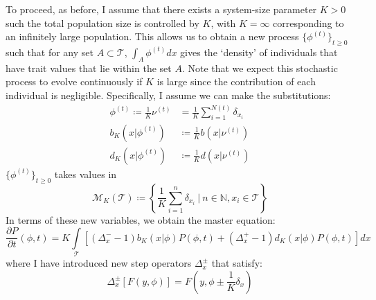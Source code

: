 To proceed, as before, I assume that there exists a system-size parameter $K > 0$ such the total population size is controlled by $K$, with $K = \infty$ corresponding to an infinitely large population. This allows us to obtain a new process $\{\phi^{(t)}\}_{t \geq 0}$ such that for any set $A \subset \mathcal{T}$, $\int_A\phi^{(t)}dx$ gives the `density' of individuals that have trait values that lie within the set $A$. Note that we expect this stochastic process to evolve continuously if $K$ is large since the contribution of each individual is negligible. Specifically, I assume we can make the substitutions:
\begin{align*}
    \phi^{(t)} \coloneqq \frac{1}{K}\nu^{(t)} &= \frac{1}{K}\sum\limits_{i=1}^{N(t)}\delta_{x_i}\\
    b_K(x|\phi^{(t)}) &\coloneqq \frac{1}{K}b(x|\nu^{(t)})\\
    d_K(x|\phi^{(t)}) &\coloneqq \frac{1}{K}d(x|\nu^{(t)})
\end{align*}
$\{\phi^{(t)}\}_{t\geq0}$ takes values in 
\begin{equation*}
    \mathcal{M}_{K}(\mathcal{T}) \coloneqq \left\{\frac{1}{K}\sum\limits_{i=1}^{n}\delta_{x_i} \ | \ n \in \mathbb{N}, x_i \in \mathcal{T}\right\}
\end{equation*}
In terms of these new variables, we obtain the master equation:
\begin{equation}
\label{M_equation}
    \frac{\partial P}{\partial t}(\phi,t) = K\int\limits_{\mathcal{T}}\left[(\Delta^{-}_{x}-1)b_K(x|\phi)P(\phi,t) +(\Delta^{+}_{x}-1)d_K(x|\phi)P(\phi,t)\right]dx
\end{equation}
where I have introduced new step operators $\Delta_{x}^{\pm}$ that satisfy:
\begin{equation*}
    \Delta_{x}^{\pm}[F(y,\phi)] =  F\left(y,\phi \pm \frac{1}{K}\delta_x\right)
\end{equation*}

